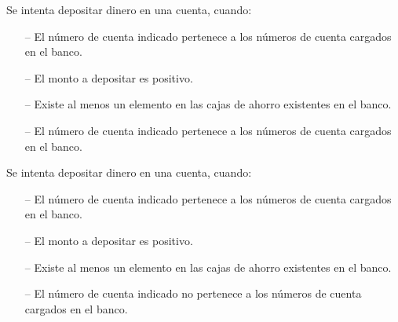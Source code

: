 \begin{tcolorbox}[colback=gray!5!white,colframe=gray!50!black,
  colbacktitle=gray!75!black,title=Depositar\_SP\_5]
  Se intenta depositar dinero en una cuenta, cuando:
     \begin{itemize}
        \item[--]{El número de cuenta indicado pertenece a los números de cuenta cargados en el banco.}
        \item[--]{El monto a depositar es positivo.}
        \item[--]{Existe al menos un elemento en las cajas de ahorro existentes en el banco.}
        \item[--]{El número de cuenta indicado pertenece a los números de cuenta cargados en el banco.}
     \end{itemize}
\end{tcolorbox}



\begin{tcolorbox}[colback=gray!5!white,colframe=gray!50!black,
  colbacktitle=gray!75!black,title=Depositar\_SP\_6]
  Se intenta depositar dinero en una cuenta, cuando:
     \begin{itemize}
        \item[--]{El número de cuenta indicado pertenece a los números de cuenta cargados en el banco.}
        \item[--]{El monto a depositar es positivo.}
        \item[--]{Existe al menos un elemento en las cajas de ahorro existentes en el banco.}
        \item[--]{El número de cuenta indicado no pertenece a los números de cuenta cargados en el banco.}
     \end{itemize}
\end{tcolorbox}



